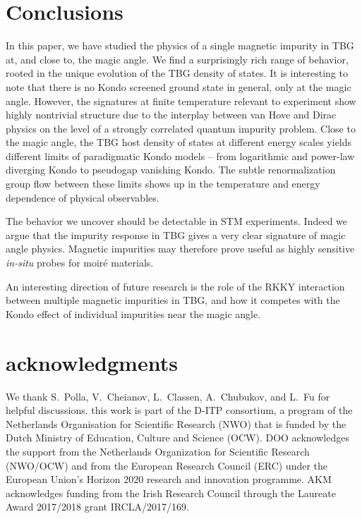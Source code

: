 

\section{Conclusions}
\label{sec:conclusions}
In this paper, we have studied the physics of a single magnetic impurity in TBG at, and close to, the magic angle. We find a surprisingly rich range of behavior, rooted in the unique evolution of the TBG density of states. It is interesting to note that there is no Kondo screened ground state in general, only at the magic angle. However, the signatures at finite temperature relevant to experiment show highly nontrivial structure due to the interplay between van Hove and Dirac physics on the level of a strongly correlated quantum impurity problem. Close to the magic angle, the TBG host density of states at different energy scales yields different limits of paradigmatic Kondo models -- from logarithmic and power-law diverging Kondo to pseudogap vanishing Kondo. The subtle renormalization group flow between these limits shows up in the temperature and energy dependence of physical observables.

The behavior we uncover should be detectable in STM experiments. Indeed we argue that the impurity response in TBG gives a very clear signature of magic angle physics. Magnetic impurities may therefore prove useful as highly sensitive \textit{in-situ} probes for moir\'{e} materials.

An interesting direction of future research is the role of the RKKY interaction between multiple magnetic impurities in TBG, and how it competes with the Kondo effect of individual impurities near the magic angle.



\section*{acknowledgments}
	We thank S.~Polla, V.~Cheianov, L.~Classen, A.~Chubukov, and L.~Fu for helpful discussions. this work is part of the D-ITP consortium,
	a program of the Netherlands Organisation for Scientific Research (NWO) that is funded by the Dutch Ministry of Education, Culture and Science (OCW). DOO acknowledges the support from the Netherlands Organization for Scientific Research (NWO/OCW) and from the European Research Council (ERC) under the European Union's Horizon 2020 research and innovation programme. AKM acknowledges funding from the Irish Research Council through the Laureate Award 2017/2018 grant IRCLA/2017/169.


